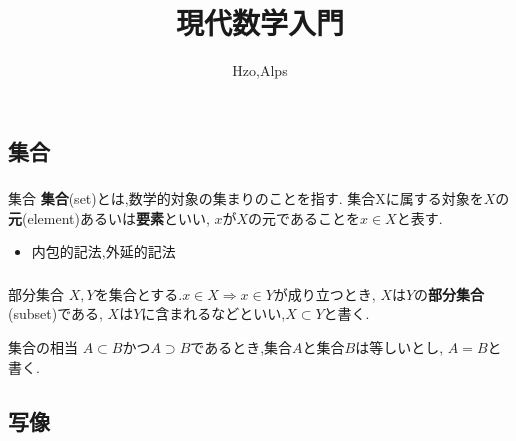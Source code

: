 \documentclass[dvipdfmx,b4j]{jsarticle}
\begin{document}
\title{現代数学入門}
\author{Hzo,Alps}

\maketitle
\tableofcontents

\section{}
\subsection{集合}
\subsubsection{}
\begin{definition}{集合}{}
\textbf{集合}(set)とは,数学的対象の集まりのことを指す.
集合Xに属する対象を$X$の\textbf{元}(element)あるいは\textbf{要素}といい,
$x$が$X$の元であることを$x\in X$と表す.
\end{definition}
\begin{itemize}
\item 内包的記法,外延的記法
\end{itemize}

\subsubsection{}
\begin{definition}{部分集合}{}
$X,Y$を集合とする.$x\in X\Longrightarrow x\in Y$が成り立つとき,
$X$は$Y$の\textbf{部分集合}(subset)である,
$X$は$Y$に含まれるなどといい,$X\subset Y$と書く.
\end{definition}
\begin{definition}{集合の相当}{}
$A\subset B $かつ$A\supset B$であるとき,集合$A$と集合$B$は等しいとし,
$A = B $と書く.
\end{definition}
\subsection{写像}
\end{document}

